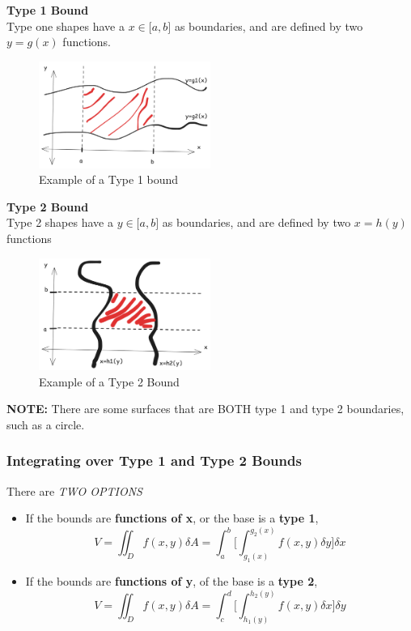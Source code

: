 \documentclass{article}
\begin{document}
\textbf{Type 1 Bound}\\
Type one shapes have a $x \in \lbrack a, b \rbrack$ as boundaries, and are defined by two $y = g(x)$ functions.
\begin{figure}[H]
    \centering
    \includegraphics[width=0.5\textwidth]{figures/Type1Example.png}
    \caption{Example of a Type 1 bound}
\end{figure}
\textbf{Type 2 Bound} \\
Type 2 shapes have a $y \in \lbrack a, b \rbrack$ as boundaries, and are defined by two $x = h(y)$ functions
\begin{figure}[H]
    \centering
    \includegraphics[width=0.5\textwidth]{figures/Type2Example.png}
    \caption{Example of a Type 2 Bound}
\end{figure}
\textbf{NOTE:} There are some surfaces that are BOTH type 1 and type 2 boundaries, such as a circle.

\subsubsection{Integrating over Type 1 and Type 2 Bounds}
There are \emph{TWO OPTIONS}
\begin{itemize}
    \item If the bounds are \textbf{functions of x}, or the base is a \textbf{type 1}, $$V = \iint_D f(x, y) \delta A = \int_{a}^{b} \big[ \int_{g_1(x)}^{g_2(x)} f(x, y) \delta y \big]\delta x$$
    \item If the bounds are \textbf{functions of y}, of the base is a \textbf{type 2}, $$V = \iint_D f(x, y) \delta A =\int_{c}^{d} \big[\int_{h_1(y)}^{h_2(y)} f(x, y) \delta x \big]  \delta y $$
\end{itemize}
\end{document}
